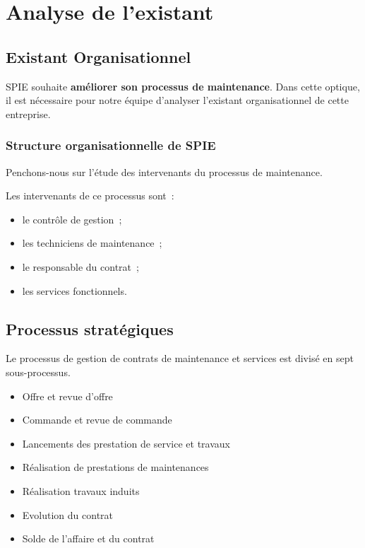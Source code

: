 \chapter{Analyse de l’existant}

\section{Existant Organisationnel}
SPIE souhaite \textbf{améliorer son processus de maintenance}. Dans cette optique, il est nécessaire pour notre équipe d'analyser l'existant organisationnel de cette entreprise.

\subsection{Structure organisationnelle de SPIE}
Penchons-nous sur l'étude des intervenants du processus de maintenance.

Les intervenants de ce processus sont~:
\begin{itemize}
\item le contrôle de gestion~;
\item les techniciens de maintenance~;
\item le responsable du contrat~;
\item les services fonctionnels.\\
\end{itemize}


\section{Processus stratégiques}

Le processus de gestion de contrats de maintenance et services est divis\'e en sept sous-processus.

\begin{itemize}
    \item Offre et revue d'offre
    \item Commande et revue de commande
    \item Lancements des prestation de service et travaux
    \item R\'ealisation de prestations de maintenances
    \item R\'ealisation travaux induits
    \item Evolution du contrat
    \item Solde de l'affaire et du contrat
\end{itemize}

